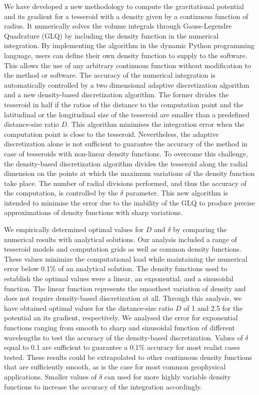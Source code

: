 \documentclass[extra, referee]{gji}
\begin{document}
We have developed a new methodology to compute the gravitational potential and its
gradient for a tesseroid with a density given by a continuous function of radius.
It numerically solves the volume integrals through Gauss-Legendre Quadrature (GLQ) by
including the density function in the numerical integration.
By implementing the algorithm in the dynamic Python programming language, users can
define their own density function to supply to the software.
This allows the use of any arbitrary continuous function without modification to the
method or software.
The accuracy of the numerical integration is automatically controlled by a two
dimensional adaptive discretization algorithm and a new density-based discretization
algorithm.
The former divides the tesseroid in half if the ratios of the distance to the
computation point and the latitudinal or the longitudinal size of the tesseroid are
smaller than a predefined distance-size ratio $D$.
This algorithm minimises the integration error when the computation point is close to
the tesseroid.
Nevertheless, the adaptive discretization alone is not sufficient to guarantee the
accuracy of the method in case of tesseroids with non-linear density functions.
To overcome this challenge, the density-based discretization algorithm
divides the tesseroid along the radial dimension on the points at which the maximum
variations of the density function take place.
The number of radial divisions performed, and thus the accuracy of the computation, is
controlled by the $\delta$ parameter.
This new algorithm is intended to minimise the error due to the inability of
the GLQ to produce precise approximations of density functions with sharp variations.

We empirically determined optimal values for $D$ and $\delta$ by comparing the numerical
results with analytical solutions.
Our analysis included a range of tesseroid models and computation grids as well as
common density functions.
These values minimize the computational load while maintaining the numerical error below
0.1\% of an analytical solution.
The density functions used to establish the optimal values were a linear, an
exponential, and a sinusoidal function.
The linear function represents the smoothest variation of density and does not require
density-based discretization at all.
Through this analysis, we have obtained optimal values for the distance-size ratio $D$
of 1 and 2.5 for the potential an its gradient, respectively.
We analysed the error for exponential functions ranging from smooth to sharp and
sinusoidal function of different wavelengths to test the accuracy of the density-based
discretization.
Values of $\delta$ equal to 0.1 are sufficient to guarantee a 0.1\% accuracy for most
realist cases tested.
These results could be extrapolated to other continuous density functions that are
sufficiently smooth, as is the case for most common geophysical applications.
Smaller values of $\delta$ can used for more highly variable density functions to
increase the accuracy of the integration accordingly.
\end{document}
